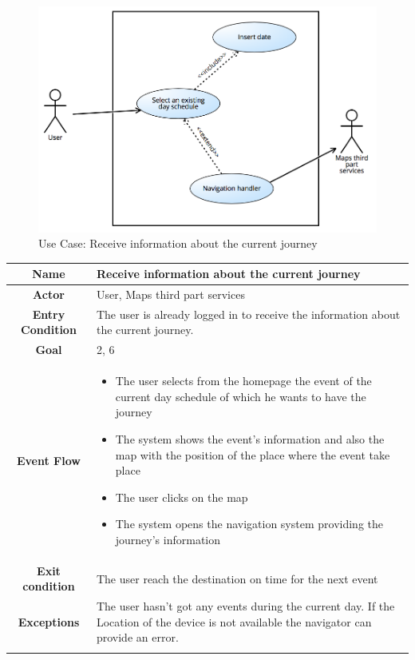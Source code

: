 \documentclass[numbers=noenddot, 12pt, a4paper, oneside]{scrbook}
\begin{document}
\begin{figure}[H]
	\includegraphics[width=1\textwidth]{usecases/Scenario9}
	\caption{Use Case: Receive information about the current journey}
\end{figure}


\begin{tabular}{|c|p{}|}
	\hline
	\parbox[c][6ex]{6ex}{\centering \textbf{Name}} & Receive information about the current journey
	\\
	\hline
	\parbox[c][6ex]{6ex}{\centering \textbf{Actor}} & User, Maps third part services \\
	\hline
	\parbox[c][10ex]{15ex}{\centering \textbf{Entry Condition}} & The user is already logged in to receive the information about the current journey.
	\\
	\hline
	\parbox[c][6ex]{6ex}{\centering \textbf{Goal}} & 2, 6 \\
	\hline
	\parbox[c][10ex]{12ex}{\centering \textbf{Event Flow}} & \begin{itemize}
		\item The user selects from the homepage the event of the current day schedule of which he wants to have the journey
		\item The system shows the event’s information and also the map with the position of the place where the event take place
		\item The user clicks on the map
		\item The system opens the navigation system providing the journey’s information
	\end{itemize}\\
	\hline
	\parbox[c][7ex]{12ex}{\centering \textbf{Exit condition}} & The user reach the destination on time for the next event \\\hline
	\parbox[c][10ex]{13ex}{\centering \textbf{Exceptions}} & The user hasn’t got any events during the current day. If the Location of the device is not available the navigator can provide an error.
	\\ \\ \hline	
	
	
\end{tabular}
\end{document}

